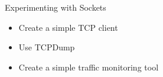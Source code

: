 \setuplabframe
{Experimenting with Sockets}
{
  \begin{itemize}
  \item Create a simple TCP client
  \item Use TCPDump
  \item Create a simple traffic monitoring tool
  \end{itemize}
}
